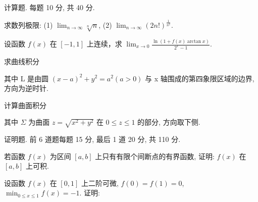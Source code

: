 \par{}
计算题. 每题 10 分, 共 40 分.\par
求数列极限: (1) $\lim_{n\to \infty}\sqrt[n]{n}$, (2) $\lim_{n\to \infty}(2n!)^{\frac{1}{n^2}}$.\par
设函数 $f(x)$ 在 $[-1, 1]$ 上连续，求 $\lim_{x \to 0} \frac{\ln(1 + f(x) \arctan x)}{2^x - 1}$.\par
\par{}
求曲线积分\par
\nopagebreak[4]
其中 L 是由圆  $(x-a)^{2}+y^{2}=a^{2}(a>0)$  与 x 轴围成的第四象限区域的边界, 方向为逆时针.\par
\par{}
计算曲面积分\par
\nopagebreak[4]
其中 $\Sigma$ 为曲面 $z = \sqrt{x^2 + y^2}$ 在 $0 \leq z \leq 1$ 的部分, 方向取下侧.\par
\par{}
证明题. 前 6 道题每题 15 分, 最后 1 道 20 分, 共 110 分.\par
若函数 $f(x)$ 为区间 $[a, b]$ 上只有有限个间断点的有界函数, 证明: $f(x)$ 在 $[a, b]$ 上可积.\par
\par{}
设函数 $f(x)$ 在 $[0,1]$ 上二阶可微, $f(0) = f(1) = 0$, $\min_{0 \leq x \leq 1} f(x) = -1$. 证明:\par
\nopagebreak[4]

